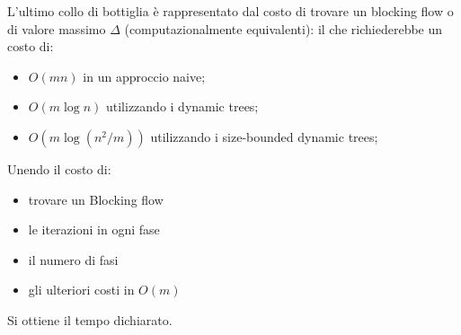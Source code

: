     L'ultimo collo di bottiglia è rappresentato dal costo di trovare un blocking flow o di valore massimo $\Delta$ (computazionalmente equivalenti):
    il che richiederebbe un costo di:
    \begin{itemize}
        \item $O(mn)$ in un approccio naive;
        \item $O(m\log n)$ utilizzando i dynamic trees;
        \item $O(m \log(n^2/m))$ utilizzando i size-bounded dynamic trees;
    \end{itemize}
    Unendo il costo di:
    \begin{itemize}[label=$\times$]
        \item trovare un Blocking flow
        \item le iterazioni in ogni fase
        \item il numero di fasi
        \item gli ulteriori costi in $O(m)$
    \end{itemize}
    Si ottiene il tempo dichiarato.


\cleardoublepage